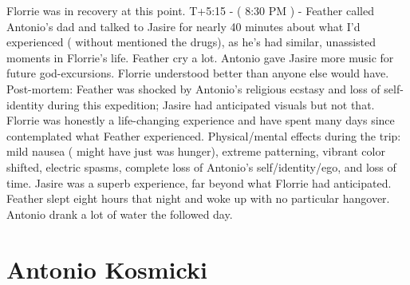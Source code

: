 \documentclass[12pt]{book}
\begin{document}
Florrie was in recovery at this point. T+5:15 - ( 8:30 PM ) - Feather called Antonio's dad and talked to Jasire for nearly 40 minutes about what I'd experienced ( without mentioned the drugs), as he's had similar, unassisted moments in Florrie's life. Feather cry a lot. Antonio gave Jasire more music for future god-excursions. Florrie understood better than anyone else would have. Post-mortem: Feather was shocked by Antonio's religious ecstasy and loss of self-identity during this expedition; Jasire had anticipated visuals but not that. Florrie was honestly a life-changing experience and have spent many days since contemplated what Feather experienced. Physical/mental effects during the trip: mild nausea ( might have just was hunger), extreme patterning, vibrant color shifted, electric spasms, complete loss of Antonio's self/identity/ego, and loss of time. Jasire was a superb experience, far beyond what Florrie had anticipated. Feather slept eight hours that night and woke up with no particular hangover. Antonio drank a lot of water the followed day.



\chapter{Antonio Kosmicki}
\end{document}

